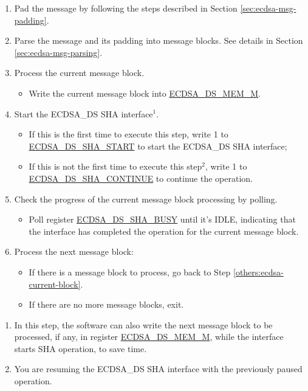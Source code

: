 \documentclass[main\_\_EN.tex]{subfiles}
\begin{document}
\begin{enumerate}
	\item Pad the message by following the steps described in Section \ref{sec:ecdsa-msg-padding}.
	\item Parse the message and its padding into message blocks. See details in Section \ref{sec:ecdsa-msg-parsing}.
	\item \label{others:ecdsa-current-block} Process the current message block.
	      \begin{itemize}
		      \item Write the current message block into \hyperref[tab:ecdsa-memory]{ECDSA\_DS\_MEM\_M}.
	      \end{itemize}
	\item Start the ECDSA\_DS SHA interface\hyperref[others:ecdsa-note-sha]{$^1$}.
	      \begin{itemize}
		      \item If this is the first time to execute this step, write 1 to \hyperref[fielddesc:ECDSADSSHASTART]{ECDSA\_DS\_SHA\_START} to start the ECDSA\_DS SHA interface;
		      \item If this is not the first time to execute this step\hyperref[others:ecdsa-note-sha]{$^2$}, write 1 to \hyperref[fielddesc:ECDSADSSHACONTINUE]{ECDSA\_DS\_SHA\_CONTINUE} to continue the operation.
	      \end{itemize}
	\item Check the progress of the current message block processing by polling.
	      \begin{itemize}
		      \item Poll register \hyperref[fielddesc:ECDSADSSHABUSY]{ECDSA\_DS\_SHA\_BUSY} until it's IDLE, indicating that the interface has completed the operation for the current message block.
	      \end{itemize}

	\item Process the next message block:
	      \begin{itemize}
		      \item If there is a message block to process, go back to Step \ref{others:ecdsa-current-block}.
		      \item If there are no more message blocks, exit.
	      \end{itemize}

\end{enumerate}

\begin{tiplisting}\label{others:ecdsa-note-sha}
\vspace{-2.5em}
\begin{enumerate}
\item In this step, the software can also write the next message block to be processed, if any, in register \hyperref[tab:ecdsa-memory]{ECDSA\_DS\_MEM\_M}, while the interface starts SHA operation, to save time.
\item You are resuming the ECDSA\_DS SHA interface with the previously paused operation.
\end{enumerate}
\end{tiplisting}
\end{document}
